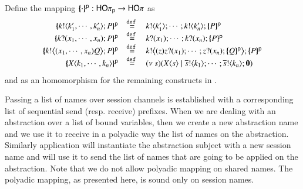 \begin{definition}Define the mapping $\{\!\!\{\cdot\}\!\!\}^\mathsf{p}:\mathsf{HO}\pi_{\mathsf{p}} \to \mathsf{HO}\pi$ as
\[
	\begin{array}{rcl}
			\auxmap{\bout{k}{k'_1, \cdots, k'_n} P}{\mathsf{p}} &\defeq& \bout{k}{k'_1} \cdots ;  \bout{k}{k'_n} \auxmap{P}{\mathsf{p}}\\
			\auxmap{\binp{k}{x_1, \cdots, x_n} P}{\mathsf{p}} &\defeq& \binp{k}{x_1} \cdots ; \binp{k}{x_n}  \auxmap{P}{\mathsf{p}} \\
			\auxmap{\bbout{k}{\abs{x_1, \cdots, x_n} Q} P}{\mathsf{p}} &\defeq& \bbout{k}{\abs{z}\binp{z}{x_1} \cdots ; \binp{z}{x_n}\auxmap{Q}{\mathsf{p}}} \auxmap{P}{\mathsf{p}}\\
			\auxmap{\appl{X}{k_1, \cdots, k_n}}{\mathsf{p}}  &\defeq& \newsp{s}{\appl{X}{s} \Par \bout{\dual{s}}{k_1} \cdots ; \bout{\dual{s}}{k_n} \inact}
	\end{array}
	\]
	and as an homomorphism for the remaining constructs in \pHOp. 
\end{definition}

Passing a list of names over session channels is established
with a corresponding list of sequential send (resp. receive) prefixes.
When we are dealing with an abstraction over a list of bound variables,
then we create a new abstraction name and we use it to receive in a polyadic
way the list of names on the abstraction. Similarly application will instantiate
the abstraction subject with a new session name and will use it 
to send the list of names that are going to be applied on the abstraction.
Note that we do not allow polyadic mapping on shared names.
The polyadic mapping, as presented here, is sound only on session names.




